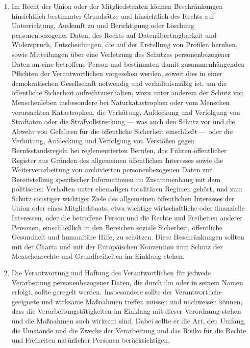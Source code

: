 \begin{enumerate}
   \item Im Recht der Union oder der Mitgliedstaaten können Beschränkungen hinsichtlich bestimmter Grundsätze und
    hinsichtlich des Rechts auf Unterrichtung, Auskunft zu und Berichtigung oder Löschung personenbezogener Daten, des
    Rechts auf Datenübertragbarkeit und Widerspruch, Entscheidungen, die auf der Erstellung von Profilen beruhen, sowie
    Mitteilungen über eine Verletzung des Schutzes personenbezogener Daten an eine betroffene Person und bestimmten
    damit zusammenhängenden Pflichten der Verantwortlichen vorgesehen werden, soweit dies in einer demokratischen
    Gesellschaft notwendig und verhältnismäßig ist, um die öffentliche Sicherheit aufrechtzuerhalten, wozu unter
    anderem der Schutz von Menschenleben insbesondere bei Naturkatastrophen oder vom Menschen verursachten
    Katastrophen, die Verhütung, Aufdeckung und Verfolgung von Straftaten oder die Strafvollstreckung — was auch den
    Schutz vor und die Abwehr von Gefahren für die öffentliche Sicherheit einschließt — oder die Verhütung, Aufdeckung
    und Verfolgung von Verstößen gegen Berufsstandsregeln bei reglementierten Berufen, das Führen öffentlicher Register
    aus Gründen des allgemeinen öffentlichen Interesses sowie die Weiterverarbeitung von archivierten personenbezogenen
    Daten zur Bereitstellung spezifischer Informationen im Zusammenhang mit dem politischen Verhalten unter ehemaligen
    totalitären Regimen gehört, und zum Schutz sonstiger wichtiger Ziele des allgemeinen öffentlichen Interesses der
    Union oder eines Mitgliedstaats, etwa wichtige wirtschaftliche oder finanzielle Interessen, oder die betroffene
    Person und die Rechte und Freiheiten anderer Personen, einschließlich in den Bereichen soziale Sicherheit,
    öffentliche Gesundheit und humanitäre Hilfe, zu schützen. Diese Beschränkungen sollten mit der Charta und mit der
    Europäischen Konvention zum Schutz der Menschenrechte und Grundfreiheiten im Einklang stehen.%
   \label{itm:eg-73}
   

   \item Die Verantwortung und Haftung des Verantwortlichen für jedwede Verarbeitung personenbezogener Daten, die durch
    ihn oder in seinem Namen erfolgt, sollte geregelt werden. Insbesondere sollte der Verantwortliche geeignete und
    wirksame Maßnahmen treffen müssen und nachweisen können, dass die Verarbeitungstätigkeiten im Einklang mit dieser
    Verordnung stehen und die Maßnahmen auch wirksam sind. Dabei sollte er die Art, den Umfang, die Umstände und die
    Zwecke der Verarbeitung und das Risiko für die Rechte und Freiheiten natürlicher Personen berücksichtigen.%
   \label{itm:eg-74}
   

\end{enumerate}
